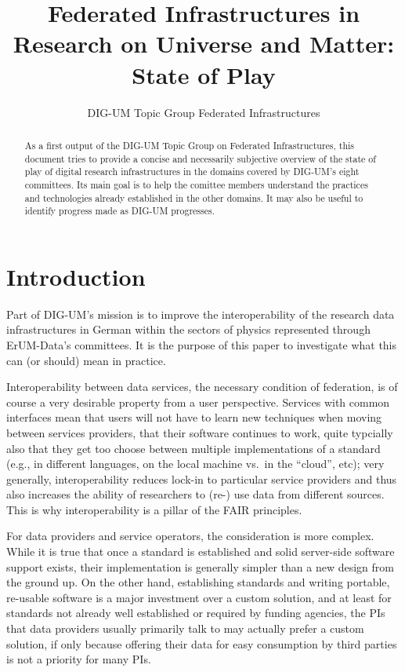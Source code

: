 \documentclass{article}
\title{Federated Infrastructures in Research on Universe and Matter:
State of Play}
\author{DIG-UM Topic Group Federated Infrastructures}
\begin{document}
\maketitle
\begin{abstract}
As a first output of the DIG-UM Topic Group on Federated Infrastructures,
this document tries to provide a concise and necessarily subjective
overview of the state of play of digital research infrastructures in
the domains covered by DIG-UM's eight committees.  Its main goal is to
help the comittee members understand the practices and technologies
already established in the other domains.  It may also be useful to
identify progress made as DIG-UM progresses.

\end{abstract}

\section{Introduction}

Part of DIG-UM's mission is to improve the interoperability of the
research data infrastructures in German within the sectors of physics
represented through ErUM-Data's committees.  It is the purpose of this
paper to investigate what this can (or should) mean in practice.

Interoperability between data services, the necessary condition of
federation,  is of course a very desirable property from a user
perspective.  Services with common interfaces mean that users will not
have to learn new techniques when moving between services providers,
that their software continues to work, quite typcially also that they
get too choose between multiple implementations of a standard (e.g., in
different languages, on the local machine vs.~in the ``cloud'', etc);
very generally, interoperability reduces lock-in to particular service
providers and thus also increases the ability of researchers to (re-)
use data from different sources.  This is why interoperability is a
pillar of the FAIR principles.

For data providers and service operators, the consideration is more
complex.  While it is true that once a standard is established and solid
server-side software support exists, their implementation is generally
simpler than a new design from the ground up.  On the other hand,
establishing standards and writing portable, re-usable software is a
major investment over a custom solution, and at least for standards not
already well established or required by funding agencies, the PIs that
data providers usually primarily talk to may actually prefer a custom
solution, if only because offering their data for easy consumption by
third parties is not a priority for many PIs.
\end{document}
